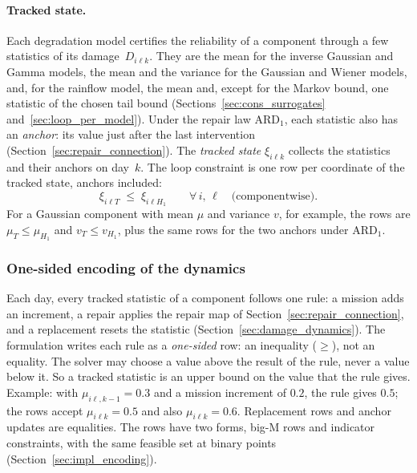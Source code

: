 \documentclass[11pt,a4paper]{article}
\theoremstyle{plain}
\theoremstyle{definition}
\theoremstyle{remark}
\begin{document}
\paragraph{Tracked state.}
Each degradation model certifies the reliability of a component through a few statistics of its damage~$D_{i\ell k}$.
They are the mean for the inverse Gaussian and Gamma models, the mean and the variance for the Gaussian and Wiener models, and, for the rainflow model, the mean and, except for the Markov bound, one statistic of the chosen tail bound (Sections~\ref{sec:cons_surrogates} and~\ref{sec:loop_per_model}).
Under the repair law $\text{ARD}_1$, each statistic also has an \emph{anchor}: its value just after the last intervention (Section~\ref{sec:repair_connection}).
The \emph{tracked state} $\xi_{i\ell k}$ collects the statistics and their anchors on day~$k$.
The loop constraint is one row per coordinate of the tracked state, anchors included:
\begin{equation}\label{eq:loop}
  \xi_{i\ell T} \;\le\; \xi_{i\ell H_1}
  \qquad \forall\, i,\,\ell \quad \text{(componentwise)}.
\end{equation}
For a Gaussian component with mean $\mu$ and variance $v$, for example, the rows are $\mu_T \le \mu_{H_1}$ and $v_T \le v_{H_1}$, plus the same rows for the two anchors under $\text{ARD}_1$.

\subsubsection{One-sided encoding of the dynamics}
\label{sec:encoding}

Each day, every tracked statistic of a component follows one rule: a mission adds an increment, a repair applies the repair map of Section~\ref{sec:repair_connection}, and a replacement resets the statistic (Section~\ref{sec:damage_dynamics}).
The formulation writes each rule as a \emph{one-sided} row: an inequality ($\ge$), not an equality.
The solver may choose a value above the result of the rule, never a value below it.
So a tracked statistic is an upper bound on the value that the rule gives.
Example: with $\mu_{i\ell,k-1} = 0.3$ and a mission increment of $0.2$, the rule gives $0.5$; the rows accept $\mu_{i\ell k} = 0.5$ and also $\mu_{i\ell k} = 0.6$.
Replacement rows and anchor updates are equalities.
The rows have two forms, big-M rows and indicator constraints, with the same feasible set at binary points (Section~\ref{sec:impl_encoding}).
\end{document}
